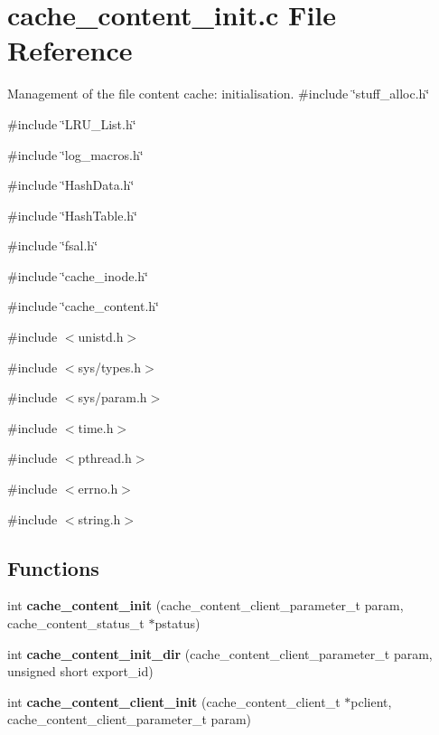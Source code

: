 \section{cache\_\-content\_\-init.c File Reference}
\label{cache__content__init_8c}


Management of the file content cache: initialisation.  
{\ttfamily \#include \char`\"{}stuff\_\-alloc.h\char`\"{}}\par
{\ttfamily \#include \char`\"{}LRU\_\-List.h\char`\"{}}\par
{\ttfamily \#include \char`\"{}log\_\-macros.h\char`\"{}}\par
{\ttfamily \#include \char`\"{}HashData.h\char`\"{}}\par
{\ttfamily \#include \char`\"{}HashTable.h\char`\"{}}\par
{\ttfamily \#include \char`\"{}fsal.h\char`\"{}}\par
{\ttfamily \#include \char`\"{}cache\_\-inode.h\char`\"{}}\par
{\ttfamily \#include \char`\"{}cache\_\-content.h\char`\"{}}\par
{\ttfamily \#include $<$unistd.h$>$}\par
{\ttfamily \#include $<$sys/types.h$>$}\par
{\ttfamily \#include $<$sys/param.h$>$}\par
{\ttfamily \#include $<$time.h$>$}\par
{\ttfamily \#include $<$pthread.h$>$}\par
{\ttfamily \#include $<$errno.h$>$}\par
{\ttfamily \#include $<$string.h$>$}\par
\subsection*{Functions}
\begin{DoxyCompactItemize}
\item 
int {\bf cache\_\-content\_\-init} (cache\_\-content\_\-client\_\-parameter\_\-t param, cache\_\-content\_\-status\_\-t $\ast$pstatus)
\item 
int {\bf cache\_\-content\_\-init\_\-dir} (cache\_\-content\_\-client\_\-parameter\_\-t param, unsigned short export\_\-id)
\item 
int {\bf cache\_\-content\_\-client\_\-init} (cache\_\-content\_\-client\_\-t $\ast$pclient, cache\_\-content\_\-client\_\-parameter\_\-t param)
\end{DoxyCompactItemize}


